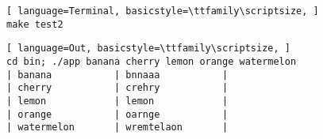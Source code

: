 
\begin{lstlisting}[ language=Terminal, basicstyle=\ttfamily\scriptsize, ]
make test2
\end{lstlisting}

\begin{lstlisting}[ language=Out, basicstyle=\ttfamily\scriptsize, ]
cd bin; ./app banana cherry lemon orange watermelon
| banana           | bnnaaa           |
| cherry           | crehry           |
| lemon            | lemon            |
| orange           | oarnge           |
| watermelon       | wremtelaon       |
\end{lstlisting}
